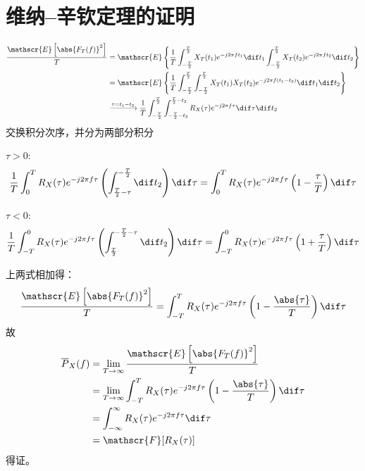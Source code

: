 \section{维纳--辛钦定理的证明}\label{appendix:V}
\begin{equation*}
    \begin{split}
        \frac{\mathscr{E}\left[\abs{F_T(f)}^2\right]}{T}&=\mathscr{E}\left\{\frac{1}{T}\int_{-\frac{T}{2}}^{\frac{T}{2}}X_T(t_1)e^{-j2\pi ft_1}\dif t_1\int_{-\frac{T}{2}}^{\frac{T}{2}}X_T(t_2)e^{-j2\pi ft_2}\dif t_2\right\} \\
        &=\mathscr{E}\left\{\frac{1}{T}\int_{-\frac{T}{2}}^{\frac{T}{2}}\int_{-\frac{T}{2}}^{\frac{T}{2}}X_T(t_1)X_T(t_2)e^{-j2\pi f(t_1-t_2)}\dif t_1\dif t_2\right\}\\
        &\xrightarrow[]{\tau=t_1-t_2}\frac{1}{T}\int_{-\frac{T}{2}}^{\frac{T}{2}}\int_{-\frac{T}{2}-t_2}^{\frac{T}{2}-t_2}R_X(\tau)e^{-j2\pi f\tau}\dif \tau\dif t_2
    \end{split}
\end{equation*}
交换积分次序，并分为两部分积分

$\tau>0$:
\begin{equation*}
   \frac{1}{T}\int_{0}^{T}R_X(\tau)e^{-j2\pi f\tau}\left(\int_{\frac{T}{2}-\tau}^{-\frac{T}{2}}\dif t_2\right)\dif\tau=\int_{0}^{T}R_X(\tau)e^{-j2\pi f\tau}\left(1-\frac{\tau}{T}\right)\dif\tau
\end{equation*}

$\tau<0$:
\begin{equation*}
   \frac{1}{T}\int_{-T}^{0}R_X(\tau)e^{-j2\pi f\tau}\left(\int_{\frac{T}{2}}^{-\frac{T}{2}-\tau}\dif t_2\right)\dif\tau=\int_{-T}^{0}R_X(\tau)e^{-j2\pi f\tau}\left(1+\frac{\tau}{T}\right)\dif\tau
\end{equation*}

上两式相加得：
\begin{equation*}
    \frac{\mathscr{E}\left[\abs{F_T(f)}^2\right]}{T}=\int_{-T}^{T}R_X(\tau)e^{-j2\pi f\tau}\left(1-\frac{\abs{\tau}}{T}\right)\dif\tau
\end{equation*}
故
\begin{equation*}
    \begin{split}
        \overline{P}_X(f)   &=\lim_{T\to\infty}\frac{\mathscr{E}\left[\abs{F_T(f)}^2\right]}{T}\\
                            &=\lim_{T\to\infty}\int_{-T}^{T}R_X(\tau)e^{-j2\pi f\tau}\left(1-\frac{\abs{\tau}}{T}\right)\dif\tau\\
                            &=\int_{-\infty}^{\infty}R_X(\tau)e^{-j2\pi f\tau}\dif\tau\\
                            &=\mathscr{F}[R_X(\tau)]
    \end{split}
\end{equation*}
得证。